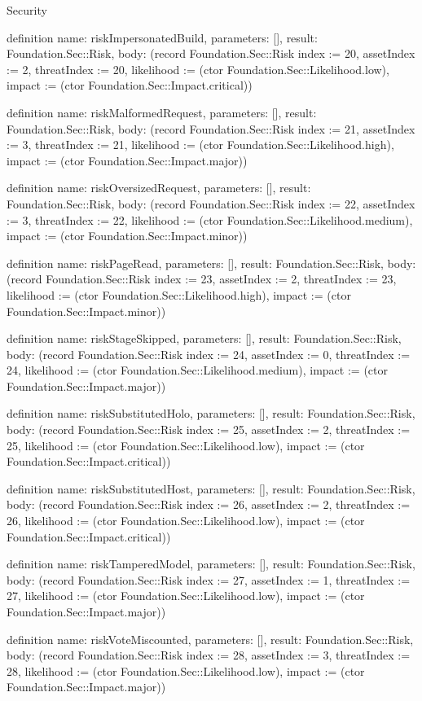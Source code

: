 \begin{lexlean}{Security}
\begin{semanticmodule}
definition{
  name: riskImpersonatedBuild,
  parameters: [],
  result: Foundation.Sec::Risk,
  body: (record Foundation.Sec::Risk {index := 20, assetIndex := 2, threatIndex := 20, likelihood := (ctor Foundation.Sec::Likelihood.low), impact := (ctor Foundation.Sec::Impact.critical)})
}

definition{
  name: riskMalformedRequest,
  parameters: [],
  result: Foundation.Sec::Risk,
  body: (record Foundation.Sec::Risk {index := 21, assetIndex := 3, threatIndex := 21, likelihood := (ctor Foundation.Sec::Likelihood.high), impact := (ctor Foundation.Sec::Impact.major)})
}

definition{
  name: riskOversizedRequest,
  parameters: [],
  result: Foundation.Sec::Risk,
  body: (record Foundation.Sec::Risk {index := 22, assetIndex := 3, threatIndex := 22, likelihood := (ctor Foundation.Sec::Likelihood.medium), impact := (ctor Foundation.Sec::Impact.minor)})
}

definition{
  name: riskPageRead,
  parameters: [],
  result: Foundation.Sec::Risk,
  body: (record Foundation.Sec::Risk {index := 23, assetIndex := 2, threatIndex := 23, likelihood := (ctor Foundation.Sec::Likelihood.high), impact := (ctor Foundation.Sec::Impact.minor)})
}

definition{
  name: riskStageSkipped,
  parameters: [],
  result: Foundation.Sec::Risk,
  body: (record Foundation.Sec::Risk {index := 24, assetIndex := 0, threatIndex := 24, likelihood := (ctor Foundation.Sec::Likelihood.medium), impact := (ctor Foundation.Sec::Impact.major)})
}

definition{
  name: riskSubstitutedHolo,
  parameters: [],
  result: Foundation.Sec::Risk,
  body: (record Foundation.Sec::Risk {index := 25, assetIndex := 2, threatIndex := 25, likelihood := (ctor Foundation.Sec::Likelihood.low), impact := (ctor Foundation.Sec::Impact.critical)})
}

definition{
  name: riskSubstitutedHost,
  parameters: [],
  result: Foundation.Sec::Risk,
  body: (record Foundation.Sec::Risk {index := 26, assetIndex := 2, threatIndex := 26, likelihood := (ctor Foundation.Sec::Likelihood.low), impact := (ctor Foundation.Sec::Impact.critical)})
}

definition{
  name: riskTamperedModel,
  parameters: [],
  result: Foundation.Sec::Risk,
  body: (record Foundation.Sec::Risk {index := 27, assetIndex := 1, threatIndex := 27, likelihood := (ctor Foundation.Sec::Likelihood.low), impact := (ctor Foundation.Sec::Impact.major)})
}

definition{
  name: riskVoteMiscounted,
  parameters: [],
  result: Foundation.Sec::Risk,
  body: (record Foundation.Sec::Risk {index := 28, assetIndex := 3, threatIndex := 28, likelihood := (ctor Foundation.Sec::Likelihood.low), impact := (ctor Foundation.Sec::Impact.major)})
}


\end{semanticmodule}
\end{lexlean}
